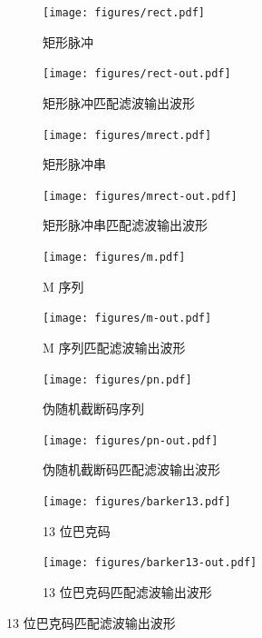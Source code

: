 \documentclass[../main]{subfiles}
\begin{document}
\begin{figure}[htbp]
  \centering
  \begin{subfigure}[htbp]{0.25\linewidth}
    \centering
    \texttt{[image: figures/rect.pdf]}
    \caption{矩形脉冲}%
    \label{fig:rect_}
  \end{subfigure}
  \quad
  \begin{subfigure}[htbp]{0.25\linewidth}
    \centering
    \texttt{[image: figures/rect-out.pdf]}
    \caption{矩形脉冲匹配滤波输出波形}%
    \label{fig:rect-out_}
  \end{subfigure}

  \begin{subfigure}[htbp]{0.25\linewidth}
    \centering
    \texttt{[image: figures/mrect.pdf]}
    \caption{矩形脉冲串}%
    \label{fig:mrect_}
  \end{subfigure}
  \quad
  \begin{subfigure}[htbp]{0.25\linewidth}
    \centering
    \texttt{[image: figures/mrect-out.pdf]}
    \caption{矩形脉冲串匹配滤波输出波形}%
    \label{fig:mrect-out_}
  \end{subfigure}

  \begin{subfigure}[htbp]{0.25\linewidth}
    \centering
    \texttt{[image: figures/m.pdf]}
    \caption{M 序列}%
    \label{fig:m_}
  \end{subfigure}
  \quad
  \begin{subfigure}[htbp]{0.25\linewidth}
    \centering
    \texttt{[image: figures/m-out.pdf]}
    \caption{M 序列匹配滤波输出波形}%
    \label{fig:m-out_}
  \end{subfigure}

  \begin{subfigure}[htbp]{0.25\linewidth}
    \centering
    \texttt{[image: figures/pn.pdf]}
    \caption{伪随机截断码序列}%
    \label{fig:pn_}
  \end{subfigure}
  \quad
  \begin{subfigure}[htbp]{0.25\linewidth}
    \centering
    \texttt{[image: figures/pn-out.pdf]}
    \caption{伪随机截断码匹配滤波输出波形}%
    \label{fig:pn-out_}
  \end{subfigure}

  \begin{subfigure}[htbp]{0.25\linewidth}
    \centering
    \texttt{[image: figures/barker13.pdf]}
    \caption{13 位巴克码}%
    \label{fig:barker13_}
  \end{subfigure}
  \quad
  \begin{subfigure}[htbp]{0.25\linewidth}
    \centering
    \texttt{[image: figures/barker13-out.pdf]}
    \caption{13 位巴克码匹配滤波输出波形}%
    \label{fig:barker13-out_}
  \end{subfigure}


\end{figure}
\end{document}
